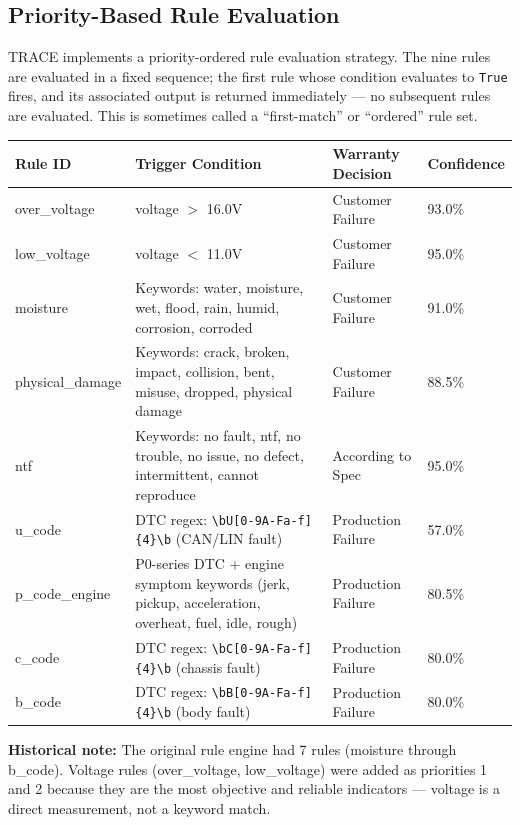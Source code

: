 \documentclass[10pt]{article}
\begin{document}
\subsection{Priority-Based Rule Evaluation}

TRACE implements a priority-ordered rule evaluation strategy. The nine rules are evaluated in a fixed sequence; the first rule whose condition evaluates to \texttt{True} fires, and its associated output is returned immediately --- no subsequent rules are evaluated. This is sometimes called a ``first-match'' or ``ordered'' rule set.

\begin{table}[h!]
\centering
\begin{tabular}{|p{2.2cm}|p{5.5cm}|p{3cm}|p{1.8cm}|}
\hline
\textbf{Rule ID} & \textbf{Trigger Condition} & \textbf{Warranty Decision} & \textbf{Confidence} \\ \hline
over\_voltage & voltage $>$ 16.0V & Customer Failure & 93.0\% \\ \hline
low\_voltage & voltage $<$ 11.0V & Customer Failure & 95.0\% \\ \hline
moisture & Keywords: water, moisture, wet, flood, rain, humid, corrosion, corroded & Customer Failure & 91.0\% \\ \hline
physical\_damage & Keywords: crack, broken, impact, collision, bent, misuse, dropped, physical damage & Customer Failure & 88.5\% \\ \hline
ntf & Keywords: no fault, ntf, no trouble, no issue, no defect, intermittent, cannot reproduce & According to Spec & 95.0\% \\ \hline
u\_code & DTC regex: \texttt{\textbackslash bU[0-9A-Fa-f]\{4\}\textbackslash b} (CAN/LIN fault) & Production Failure & 57.0\% \\ \hline
p\_code\_engine & P0-series DTC + engine symptom keywords (jerk, pickup, acceleration, overheat, fuel, idle, rough) & Production Failure & 80.5\% \\ \hline
c\_code & DTC regex: \texttt{\textbackslash bC[0-9A-Fa-f]\{4\}\textbackslash b} (chassis fault) & Production Failure & 80.0\% \\ \hline
b\_code & DTC regex: \texttt{\textbackslash bB[0-9A-Fa-f]\{4\}\textbackslash b} (body fault) & Production Failure & 80.0\% \\ \hline
\end{tabular}
\end{table}

\textbf{Historical note:} The original rule engine had 7 rules (moisture through b\_code). Voltage rules (over\_voltage, low\_voltage) were added as priorities 1 and 2 because they are the most objective and reliable indicators --- voltage is a direct measurement, not a keyword match.
\end{document}
